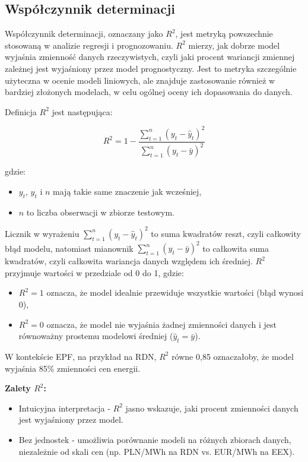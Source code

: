 \subsection{Współczynnik determinacji}
\label{subsec:r2}

Współczynnik determinacji, oznaczany jako \( R^2 \), jest metryką powszechnie stosowaną w analizie regresji i prognozowaniu. \( R^2 \) mierzy, jak dobrze model wyjaśnia zmienność danych rzeczywistych, czyli jaki procent wariancji zmiennej zależnej jest wyjaśniony przez model prognostyczny. Jest to metryka szczególnie użyteczna w ocenie modeli liniowych, ale znajduje zastosowanie również w bardziej złożonych modelach, w celu ogólnej oceny ich dopasowania do danych.

Definicja \( R^2 \) jest następująca:

\[
R^2 = 1 - \frac{\sum_{t=1}^{n} \left( y_t - \hat{y}_t \right)^2}{\sum_{t=1}^{n} \left( y_t - \bar{y} \right)^2}
\]

gdzie:
\begin{itemize}
    \item \( y_t \), \( \hat{y}_t \) i \( n \) mają takie same znaczenie jak wcześniej,
    \item \( n \) to liczba obserwacji w zbiorze testowym.
\end{itemize}

Licznik w wyrażeniu \( \sum_{t=1}^{n} \left( y_t - \hat{y}_t \right)^2 \) to suma kwadratów reszt, czyli całkowity błąd modelu, natomiast mianownik \( \sum_{t=1}^{n} \left( y_t - \bar{y} \right)^2 \) to całkowita suma kwadratów, czyli całkowita wariancja danych względem ich średniej. \( R^2 \) przyjmuje wartości w przedziale od 0 do 1, gdzie:
\begin{itemize}
    \item \( R^2 = 1 \) oznacza, że model idealnie przewiduje wszystkie wartości (błąd wynosi 0),
    \item \( R^2 = 0 \) oznacza, że model nie wyjaśnia żadnej zmienności danych i jest równoważny prostemu modelowi średniej (\( \hat{y}_t = \bar{y} \)).
\end{itemize}

W kontekście EPF, na przykład na RDN, \( R^2 \) równe 0,85 oznaczałoby, że model wyjaśnia 85\% zmienności cen energii.

\textbf{Zalety \( R^2 \):}
\begin{itemize}
    \item Intuicyjna interpretacja - \( R^2 \) jasno wskazuje, jaki procent zmienności danych jest wyjaśniony przez model.
    \item Bez jednostek - umożliwia porównanie modeli na różnych zbiorach danych, niezależnie od skali cen (np. PLN/MWh na RDN vs. EUR/MWh na EEX).
\end{itemize}

